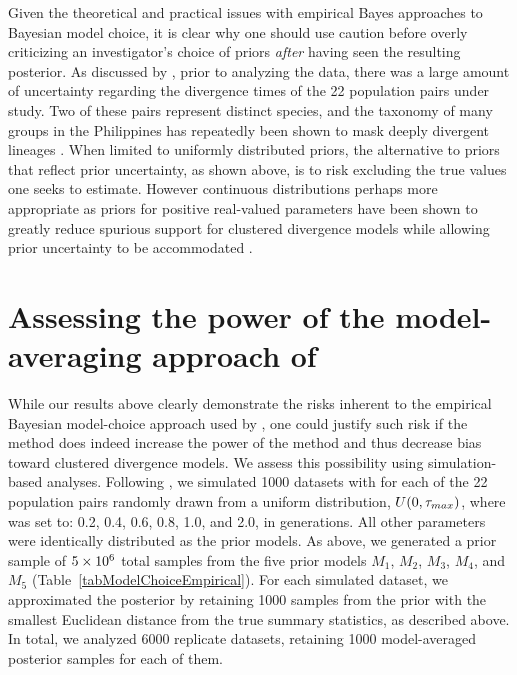 Given the theoretical and practical issues with empirical Bayes approaches to
Bayesian model choice, it is clear why one should use caution before overly
criticizing an investigator's choice of priors \emph{after} having seen the
resulting posterior.
As discussed by \citet{Oaks2012}, prior to analyzing the data, there was a
large amount of uncertainty regarding the divergence times of the 22 population
pairs under study.
Two of these pairs represent distinct species, and the taxonomy of many groups
in the Philippines has repeatedly been shown to mask deeply divergent lineages
\citep{RafeDiesmosAlcala2008,Linkem2010,Siler2010,Welton2010,Siler2011HerpMonographs,
Siler2011,Siler2012,RafeStuart2012,LinkemBrown2013,Rafe2013AREES,Siler2014kikuchii}.
When limited to uniformly distributed priors, the alternative to priors that
reflect prior uncertainty, as shown above, is to risk excluding the true values
one seeks to estimate.
However continuous distributions perhaps more appropriate as priors for
positive real-valued parameters have been shown to greatly reduce spurious
support for clustered divergence models while allowing prior uncertainty to be
accommodated \citep{Oaks2014dpp}.




\section*{Assessing the power of the model-averaging approach of
    \citet{Hickerson2013}}
While our results above clearly demonstrate the risks inherent to the empirical
Bayesian model-choice approach used by \citet{Hickerson2013}, one could justify
such risk if the method does indeed increase the power of the method and thus
decrease bias toward clustered divergence models.
We assess this possibility using simulation-based analyses.
Following \citet{Oaks2012}, we simulated 1000 datasets with \divt{} for each of
the 22 population pairs randomly drawn from a uniform distribution, $U(0,
\tau_{max})$, where  was set to: 0.2, 0.4, 0.6, 0.8, 1.0, and 2.0, in
\globalcoalunit generations.
All other parameters were identically distributed as the prior models.
As above, we generated a prior sample of $5\times 10^{6}$ total samples from the five
prior models $M_1$, $M_2$, $M_3$, $M_4$, and $M_5$
(Table~\ref{tabModelChoiceEmpirical}).
For each simulated dataset, we approximated the posterior
by retaining 1000 samples from the prior with the smallest Euclidean distance
from the true summary statistics, as described above.
In total, we analyzed 6000 replicate datasets, retaining 1000 model-averaged
posterior samples for each of them.

